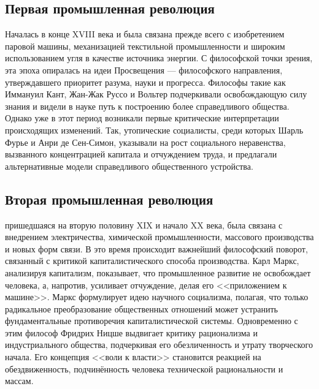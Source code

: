 \documentclass[12pt,a4paper]{article}
\begin{document}
	\subsection{Первая промышленная революция}
	\par Началась в конце XVIII века и была связана прежде всего с изобретением паровой машины, механизацией текстильной промышленности и широким использованием угля в качестве источника энергии. С философской точки зрения, эта эпоха опиралась на идеи Просвещения — философского направления, утверждавшего приоритет разума, науки и прогресса. Философы такие как Иммануил Кант, Жан-Жак Руссо и Вольтер подчеркивали освобождающую силу знания и видели в науке путь к построению более справедливого общества. Однако уже в этот период возникали первые критические интерпретации происходящих изменений. Так, утопические социалисты, среди которых Шарль Фурье и Анри де Сен-Симон, указывали на рост социального неравенства, вызванного концентрацией капитала и отчуждением труда, и предлагали альтернативные модели справедливого общественного устройства.
	\subsection{Вторая промышленная революция}
	\par пришедшаяся на вторую половину XIX и начало XX века, была связана с внедрением электричества, химической промышленности, массового производства и новых форм связи. В это время происходит важнейший философский поворот, связанный с критикой капиталистического способа производства. Карл Маркс, анализируя капитализм, показывает, что промышленное развитие не освобождает человека, а, напротив, усиливает отчуждение, делая его <<приложением к машине>>. Маркс формулирует идею научного социализма, полагая, что только радикальное преобразование общественных отношений может устранить фундаментальные противоречия капиталистической системы. Одновременно с этим философ Фридрих Ницше выдвигает критику рационализма и индустриального общества, подчеркивая его обезличенность и утрату творческого начала. Его концепция <<воли к власти>> становится реакцией на обездвиженность, подчинённость человека технической рациональности и массам.
	
\end{document}
